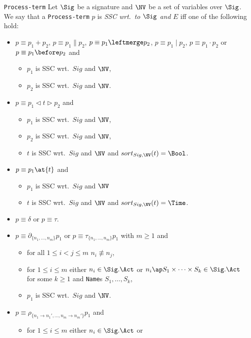 \documentclass[twoside,fleqn,a4paper,dvips]{article}
\begin{document}
\begin{Dn-arg}{{\tt Process-term}}
Let $\Sig$ be a signature and $\NV$ be a set of variables over $\Sig$.
We say that a {\tt Process-term} $p$ is {\it SSC wrt.\ to $\Sig$ and
$E$} iff one of the following hold:
\begin{itemize}
\item
$p\equiv p_1+p_2$, 
$p\equiv p_1\parallel p_2$, $p\equiv p_1\leftmerge p_2$, $p\equiv p_1\mid
p_2$,
$p\equiv p_1 {\cdot} p_2$ or $p\equiv p_1\before p_2$ and
\begin{itemize}
\item
$p_1$ is SSC wrt.\ $Sig$ and $\NV$,
\item
$p_2$ is SSC wrt.\ $Sig$ and $\NV$.
\end{itemize}
\item
$p\equiv p_1\triangleleft t \triangleright p_2$ and
\begin{itemize}
\item
$p_1$ is SSC wrt.\ $Sig$ and $\NV$,
\item
$p_2$ is SSC wrt.\ $Sig$ and $\NV$,
\item
$t$ is SSC wrt.\ $Sig$ and $\NV$ and $sort_{Sig,\NV}(t)=\Bool$.
\end{itemize}
\item
$p\equiv p_1\at{t}$ and 
\begin{itemize}
\item
$p_1$ is SSC wrt.\ $Sig$ and $\NV$
\item
$t$ is SSC wrt.\ $Sig$ and $\NV$ and $sort_{Sig,\NV}(t)=\Time$.
\end{itemize}
\item
$p\equiv \delta$ or $p\equiv\tau$.
\item
$p\equiv\partial_{\{n_1,\ldots,n_m\}}p_1$ or
$p\equiv \tau_{\{n_1,\ldots,n_m\}}p_1$ with $m\geq 1$ and
\begin{itemize}
\item
for all $1\leq i< j \leq m$ $n_i\not\equiv n_j$,
\item
for $1\leq i\leq m$ either $n_i\in \Sig.\Act$ or
$n_i\ap S_1\times \cdots\times S_k\in
\Sig.\Act$ for some $k\geq 1$ and {\tt Name}s $S_1,\ldots,S_k$,
\item
$p_1$ is SSC wrt.\ $Sig$ and $\NV$.
\end{itemize}
\item
$p\equiv\rho_{\{n_1\rightarrow n_1',\ldots,n_m\rightarrow
n_m'\}}p_1$ and
\begin{itemize}
\item
for $1\leq i\leq m$ either $n_i\in \Sig.\Act$ or

\end{itemize}
\end{itemize}
\end{Dn-arg}
\end{document}
